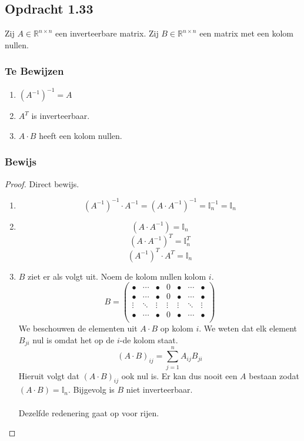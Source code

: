\documentclass[lineaire_algebra_oplossingen.tex]{subfiles}
\begin{document}
\subsection{Opdracht 1.33}
\label{1.33}
Zij $A \in \mathbb{R}^{n\times n}$ een inverteerbare matrix.
Zij $B \in \mathbb{R}^{n\times n}$ een matrix met een kolom nullen.

\subsubsection*{Te Bewijzen}
\begin{enumerate}[(1)]
\item $(A^{-1})^{-1} = A$
\item $A^T$ is inverteerbaar.
\item $A\cdot B$ heeft een kolom nullen.
\end{enumerate}

\subsubsection*{Bewijs}
\begin{proof}
Direct bewijs.
\begin{enumerate}[(1)]
\item
\[
(A^{-1})^{-1}\cdot A^{-1} = (A \cdot A^{-1})^{-1} = \mathbb{I}_n^{-1} = \mathbb{I}_n
\]

\item
\[
(A\cdot A^{-1}) = \mathbb{I}_n
\]
\[
(A\cdot A^{-1})^T = \mathbb{I}_n^T
\]
\[
(A^{-1})^T \cdot A^T= \mathbb{I}_n
\]

\item
$B$ ziet er als volgt uit. Noem de kolom nullen kolom $i$.
\[
B = 
\begin{pmatrix}
\bullet & \cdots & \bullet & 0 & \bullet & \cdots & \bullet\\
\bullet & \cdots & \bullet & 0 & \bullet & \cdots & \bullet\\
\vdots & \ddots & \vdots & \vdots & \vdots & \ddots & \vdots\\
\bullet & \cdots & \bullet & 0 & \bullet & \cdots & \bullet\\
\end{pmatrix}
\]
We beschouwen de elementen uit $A\cdot B$ op kolom $i$. We weten dat elk element $B_{ji}$ nul is omdat het op de $i$-de kolom staat.
\[
(A\cdot B)_{ij} = \sum_{j=1}^n A_{ij}B_{ji}
\]
Hieruit volgt dat $(A\cdot B)_{ij}$ ook nul is. Er kan dus nooit een $A$ bestaan zodat $(A\cdot B) = \mathbb{I}_n$. Bijgevolg is $B$ niet inverteerbaar.\\\\
Dezelfde redenering gaat op voor rijen.
\end{enumerate}
\end{proof}
\end{document}
